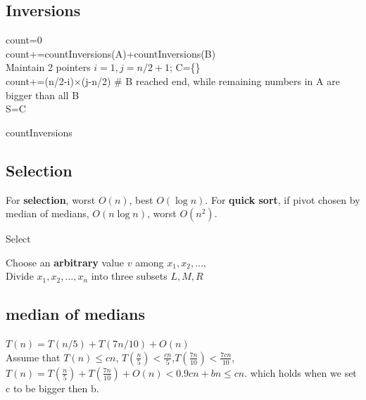 \documentclass{article}
\begin{document}
\subsection{Inversions}
\begin{algorithm}
    count=0\\
    count+=countInversions(A)+countInversions(B)\\
    Maintain 2 pointers $i=1,j=n/2+1$; C=\{\}\\
    count+=(n/2-i)$\times $(j-n/2) \# B reached end, while remaining numbers in A are bigger than all B\\
    S=C\\
    \caption{countInversions}
\end{algorithm}

\subsection{Selection}
For \textbf{selection}, worst $O(n)$, best $O(\log n)$. For \textbf{quick sort}, if pivot chosen by median of medians, $O(n\log n)$, worst $O(n^2)$.
\begin{algorithm}
    \caption{Select}
    Choose an \textbf{arbitrary} value $v$ among $x_1,x_2,\ldots,$\\
    Divide $x_1,x_2,\ldots,x_n$ into three subsets $L,M,R$\\
\end{algorithm}

\subsection{median of medians}
$T(n)=T(n/5)+T(7n/10)+O(n)$\\
Assume that $T(n) \leq cn$,
$T(\frac{n}{5})<\frac{cn}{5}$,$T(\frac{7n}{10})<\frac{7cn}{10}$,
$T(n)=T(\frac{n}{5})+T(\frac{7n}{10})+O(n)<0.9cn+bn\leq cn$. which holds when we set c to be bigger then b.
\end{document}
